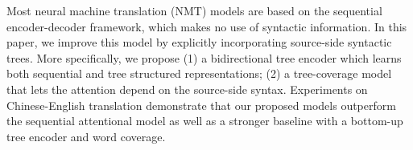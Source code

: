 Most neural machine translation (NMT) models are based on the sequential encoder-decoder framework, which makes no use of syntactic information. In this paper, we improve this model by explicitly incorporating source-side syntactic trees. More specifically, we propose (1) a bidirectional tree encoder which learns both sequential and tree structured representations; (2) a tree-coverage model that lets the attention depend on the source-side syntax. Experiments on Chinese-English translation demonstrate that our proposed models outperform the sequential attentional model as well as a stronger baseline with a bottom-up tree encoder and word coverage.
